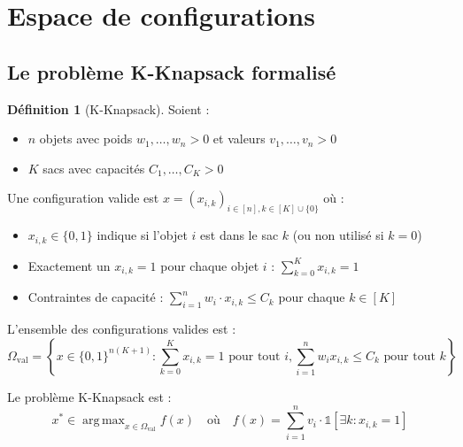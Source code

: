 \documentclass[12pt,a4paper]{article}
\theoremstyle{definition}
\newtheorem{definition}[theorem]{Définition}
\theoremstyle{remark}
\DeclareMathOperator*{\argmax}{arg\,max}
\begin{document}
	\newpage
	\section{Espace de configurations}
	
	\subsection{Le problème K-Knapsack formalisé}
	
	\begin{definition}[K-Knapsack]
		Soient :
		\begin{itemize}
			\item $n$ objets avec poids $w_1, \ldots, w_n > 0$ et valeurs $v_1, \ldots, v_n > 0$
			\item $K$ sacs avec capacités $C_1, \ldots, C_K > 0$
		\end{itemize}
		
		Une configuration valide est $x = (x_{i,k})_{i\in[n],k\in[K]\cup\{0\}}$ où :
		\begin{itemize}
			\item $x_{i,k} \in \{0, 1\}$ indique si l'objet $i$ est dans le sac $k$ (ou non utilisé si $k = 0$)
			\item Exactement un $x_{i,k} = 1$ pour chaque objet $i$ : $\sum_{k=0}^K x_{i,k} = 1$
			\item Contraintes de capacité : $\sum_{i=1}^n w_i \cdot x_{i,k} \leq C_k$ pour chaque $k \in [K]$
		\end{itemize}
		
		L'ensemble des configurations valides est :
		\begin{equation}
			\Omega_{\text{val}} = \left\{x \in \{0,1\}^{n(K+1)} : \sum_{k=0}^K x_{i,k} = 1 \text{ pour tout } i, \sum_{i=1}^n w_i x_{i,k} \leq C_k \text{ pour tout } k\right\}
		\end{equation}
		
		Le problème K-Knapsack est :
		\begin{equation}
			x^* \in \argmax_{x\in\Omega_{\text{val}}} f(x) \quad \text{où} \quad f(x) = \sum_{i=1}^n v_i \cdot \mathbb{1}[\exists k : x_{i,k} = 1]
		\end{equation}
	\end{definition}
	
\end{document}
